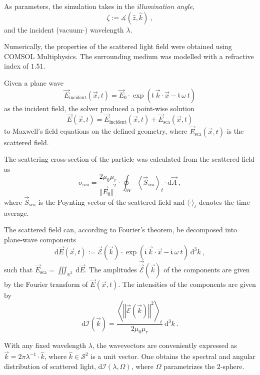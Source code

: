 \documentclass[10pt]{article}
\begin{document}
\begin{multicols}{2}
As parameters, the simulation takes in the \emph{illumination angle}, 
$$
    \zeta := \measuredangle\left( \hat{z}, \hat{k} \right) \ ,
$$
and the incident (vacuum-) wavelength $\lambda$. 

Numerically, the properties of the scattered light field were obtained using COMSOL Multiphysics. 
The surrounding medium was modelled with a refractive index of $1.51$. 

Given a plane wave 
$$
    \vec{E}_\mathrm{incident}(\vec{x},t) = \vec{E}_0 \cdot \exp\!\left( \mathfrak{i}\ \vec{k}\cdot\vec{x} - \mathfrak{i}\ \omega\ t \right)
$$
as the incident field, the solver produced a point-wise solution 
$$
    \vec{E}(\vec{x},t) = \vec{E}_\mathrm{incident}(\vec{x},t) + \vec{E}_\mathrm{sca}(\vec{x},t)
$$ 
to Maxwell's field equations on the defined geometry, where $\vec{E}_\mathrm{sca}(\vec{x},t)$ is the scattered field. 

The scattering cross-section of the particle was calculated from the scattered field as 
$$
    \sigma_\mathrm{sca} = \frac{2 \mu_0 \mu_r}{ {\bigl\Vert \vec{E}_0 \bigr\Vert}^2 } \cdot \oint_{\partial V} {\left\langle \vec{S}_\mathrm{sca} \right\rangle}_t \cdot\mathrm{d}\vec{A} \ ,
$$
where $\vec{S}_\mathrm{sca}$ is the Poynting vector of the scattered field and $\langle\cdot\rangle_t$ denotes the time average. 

The scattered field can, according to Fourier's theorem, be decomposed into plane-wave components
$$
    \mathrm{d}\vec{E}(\vec{x},t) := \vec{\mathcal{E}}(\vec{k}) 
    \cdot 
    \exp{\!\left(\mathfrak{i}\ \vec{k}\cdot\vec{x} - \mathfrak{i}\ \omega\ t \right)}
    \ \mathrm{d}^3 k
    \ , 
$$
such that $ \vec{E}_\mathrm{sca} = \iiint_{\mathds{R}^3}\ \mathrm{d}\vec{E}$. 
The amplitudes $\vec{\vec{\mathcal{E}}}(\vec{k})$ of the components are given by the Fourier transform of $\vec{E}(\vec{x},t)$. 
The intensities of the components are given by 
$$
    \mathrm{d}\mathcal{I}(\vec{k}) = \frac{ {\left\langle {\left\Vert \vec{\mathcal{E}}(\vec{k}) \right\Vert}^2 \right\rangle}_t }{ 2\mu_0 \mu_r } \ \mathrm{d}^3k
    \ .
$$

With any fixed wavelength $\lambda$, the wavevectors are conveniently expressed as $ \vec{k} = 2 \pi \lambda^{-1} \cdot \hat{k} $, where \mbox{$\hat{k} \in \mathcal{S}^2$} is a unit vector. 
One obtains the spectral and angular distribution of scattered light, $\mathrm{d}\mathcal{I}(\lambda, \Omega)$, where $\Omega$ parametrizes the 2-sphere. 







\end{multicols}
\end{document}
